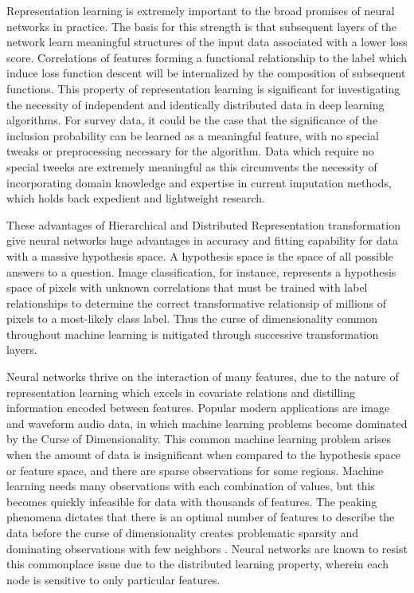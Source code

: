 \documentclass[12pt,twoside]{reedthesis}
\begin{document}
Representation learning is extremely important to the broad promises of
neural networks in practice. The basis for this strength is that
subsequent layers of the network learn meaningful structures of the
input data associated with a lower loss score. Correlations of features
forming a functional relationship to the label which induce loss
function descent will be internalized by the composition of subsequent
functions. This property of representation learning is significant for
investigating the necessity of independent and identically distributed
data in deep learning algorithms. For survey data, it could be the case
that the significance of the inclusion probability can be learned as a
meaningful feature, with no special tweaks or preprocessing necessary
for the algorithm. Data which require no special tweeks are extremely
meaningful as this circumvents the necessity of incorporating domain
knowledge and expertise in current imputation methods, which holds back
expedient and lightweight research.

These advantages of Hierarchical and Distributed Representation
transformation give neural networks huge advantages in accuracy and
fitting capability for data with a massive hypothesis space. A
hypothesis space is the space of all possible answers to a question.
Image classification, for instance, represents a hypothesis space of
pixels with unknown correlations that must be trained with label
relationships to determine the correct transformative relationsip of
millions of pixels to a most-likely class label. Thus the curse of
dimensionality common throughout machine learning is mitigated through
successive transformation layers.

Neural networks thrive on the interaction of many features, due to the
nature of representation learning which excels in covariate relations
and distilling information encoded between features. Popular modern
applications are image and waveform audio data, in which machine
learning problems become dominated by the Curse of Dimensionality. This
common machine learning problem arises when the amount of data is
insignificant when compared to the hypothesis space or feature space,
and there are sparse observations for some regions. Machine learning
needs many observations with each combination of values, but this
becomes quickly infeasible for data with thousands of features. The
peaking phenomena dictates that there is an optimal number of features
to describe the data before the curse of dimensionality creates
problematic sparsity and dominating observations with few neighbors .
Neural networks are known to resist this commonplace issue due to the
distributed learning property, wherein each node is sensitive to only
particular features.
\end{document}
